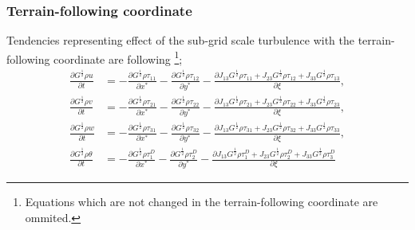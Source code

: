 \subsubsection{Terrain-following coordinate}
Tendencies representing effect of the sub-grid scale turbulence with the terrain-following coordinate are following
\footnote{Equations which are not changed in the terrain-following coordinate are ommited.};
\begin{align}
  \frac{\partial G^{\frac{1}{2}}\rho u}{\partial t}
  &=
  - \frac{\partial G^{\frac{1}{2}}\rho\tau_{11}}{\partial x^*}
  - \frac{\partial G^{\frac{1}{2}}\rho\tau_{12}}{\partial y^*}
  - \frac{\partial J_{13}G^{\frac{1}{2}}\rho\tau_{11} + J_{23}G^{\frac{1}{2}}\rho\tau_{12} + J_{33}G^{\frac{1}{2}}\rho\tau_{13}}{\partial \xi}, \\
  \frac{\partial G^{\frac{1}{2}}\rho v}{\partial t}
  &=
  - \frac{\partial G^{\frac{1}{2}}\rho\tau_{21}}{\partial x^*}
  - \frac{\partial G^{\frac{1}{2}}\rho\tau_{22}}{\partial y^*}
  - \frac{\partial J_{13}G^{\frac{1}{2}}\rho\tau_{21} + J_{23}G^{\frac{1}{2}}\rho\tau_{22} + J_{33}G^{\frac{1}{2}}\rho\tau_{23}}{\partial \xi}, \\
  \frac{\partial G^{\frac{1}{2}}\rho w}{\partial t}
  &=
  - \frac{\partial G^{\frac{1}{2}}\rho\tau_{31}}{\partial x^*}
  - \frac{\partial G^{\frac{1}{2}}\rho\tau_{32}}{\partial y^*}
  - \frac{\partial J_{13}G^{\frac{1}{2}}\rho\tau_{31} + J_{23}G^{\frac{1}{2}}\rho\tau_{32} + J_{33}G^{\frac{1}{2}}\rho\tau_{33}}{\partial \xi}, \\
  \frac{\partial G^{\frac{1}{2}} \rho \theta}{\partial t}
  &=
  - \frac{\partial G^{\frac{1}{2}}\rho\tau^D_1}{\partial x^*}
  - \frac{\partial G^{\frac{1}{2}}\rho\tau^D_2}{\partial y^*}
  - \frac{\partial J_{13}G^{\frac{1}{2}}\rho\tau^D_1 + J_{23}G^{\frac{1}{2}}\rho\tau^D_2 + J_{33}G^{\frac{1}{2}}\rho\tau^D_3}{\partial \xi}
\end{align}
